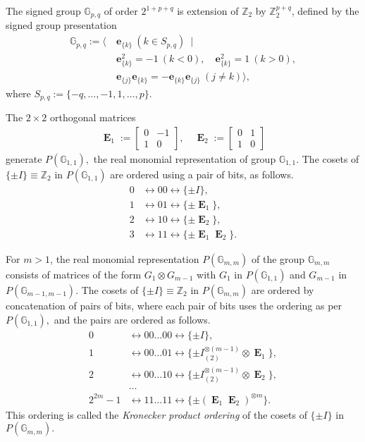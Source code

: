 \documentclass[11pt,a4paper]{jacodesmath}
\newcommand{\mb}[1]{\mathbb{#1}}
\newcommand{\mf}[1]{\mathbf{#1}}
\newcommand{\oE}{\mf{\operatorname{E}}}
\newcommand{\G}{\mb{G}}
\newcommand{\Z}{\mb{Z}}
\newcommand{\Rep}{P}
\begin{document}
The signed group \cite{Cra95}
$\G_{p,q}$ of order $2^{1+p+q}$
is extension of $\Z_2$ by $\Z_2^{p+q}$,
defined by the signed group presentation
%
\begin{align*}
\G_{p,q} := \bigg\langle \
&\mf{e}_{\{k\}}\ (k \in S_{p,q})\ \mid
\\
&\mf{e}_{\{k\}}^2 = -1\ (k < 0), \quad \mf{e}_{\{k\}}^2 = 1\ (k > 0),
\\
&\mf{e}_{\{j\}}\mf{e}_{\{k\}} = -\mf{e}_{\{k\}}\mf{e}_{\{j\}}\ (j \neq k) \bigg\rangle,
\end{align*}
%
where $S_{p,q} := \{-q,\ldots,-1,1,\ldots,p\}.$
%

The $2 \times 2$ orthogonal matrices
\begin{align*}
\oE_1 :=
\left[
\begin{array}{cc}
0 & -1 \\
1 & 0
\end{array}
\right],
\quad
\oE_2 :=
\left[
\begin{array}{cc}
0 & 1 \\
1 & 0
\end{array}
\right]
\end{align*}
generate $\Rep(\G_{1,1}),$ the real monomial representation of group $\G_{1,1}.$
The cosets of $\{\pm I\} \equiv \Z_2$ in $\Rep(\G_{1,1})$ are
ordered using a pair of bits, as follows.
\begin{align*}
0 &\leftrightarrow 00 \leftrightarrow \{ \pm I \},
\\
1 &\leftrightarrow 01 \leftrightarrow \{ \pm \oE_1 \},
\\
2 &\leftrightarrow 10 \leftrightarrow \{ \pm \oE_2 \},
\\
3 &\leftrightarrow 11 \leftrightarrow \{ \pm \oE_1 \oE_2 \}.
\end{align*}

For $m > 1$,
the real monomial representation $\Rep(\G_{m,m})$ of the
group $\G_{m,m}$ consists of matrices of the form $G_1 \otimes G_{m-1}$
with $G_1$ in $\Rep(\G_{1,1})$ and $G_{m-1}$ in $\Rep(\G_{m-1,m-1}).$
The cosets of $\{\pm I\} \equiv \Z_2$ in $\Rep(\G_{m,m})$ are
ordered by concatenation of pairs of bits,
where each pair of bits uses the ordering as per $\Rep(\G_{1,1}),$
and the pairs are ordered as follows.
\begin{align*}
0 &\leftrightarrow 00 \ldots 00 \leftrightarrow \{ \pm I \},
\\
1 &\leftrightarrow 00 \ldots 01 \leftrightarrow \{ \pm I_{(2)}^{\otimes {(m-1)}} \otimes  \oE_1 \},
\\
2 &\leftrightarrow 00 \ldots 10 \leftrightarrow \{ \pm I_{(2)}^{\otimes {(m-1)}} \otimes  \oE_2 \},
\\
&\ldots
\\
2^{2m} - 1 &\leftrightarrow 11 \ldots 11 \leftrightarrow \{ \pm (\oE_1 \oE_2)^{\otimes {m}} \}.
\end{align*}
This ordering is called
the \emph{Kronecker product ordering} of the cosets of $\{\pm I\}$ in $\Rep(\G_{m,m}).$
\end{document}
